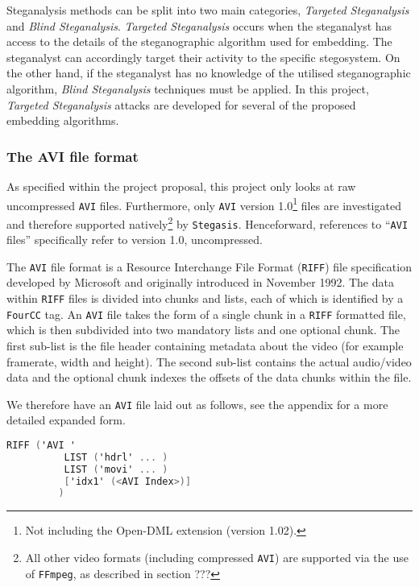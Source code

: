 \documentclass[paper=a4, fontsize=11pt,twoside]{scrartcl}    %
\begin{document}
Steganalysis methods can be split into two main categories, \textit{Targeted Steganalysis} and \textit{Blind Steganalysis}. \textit{Targeted Steganalysis} occurs when the steganalyst has access to the details of the steganographic algorithm used for embedding. The steganalyst can accordingly target their activity to the specific stegosystem. On the other hand, if the steganalyst has no knowledge of the utilised steganographic algorithm, \textit{Blind Steganalysis} techniques must be applied. In this project, \textit{Targeted Steganalysis} attacks are developed for several of the proposed embedding algorithms.

\subsubsection{The AVI file format}
As specified within the project proposal, this project only looks at raw uncompressed \texttt{AVI} files. Furthermore, only \texttt{AVI} version 1.0\footnote{Not including the Open-DML extension (version 1.02).} files are investigated and therefore supported natively\footnote{All other video formats (including compressed \texttt{AVI}) are supported via the use of \texttt{FFmpeg}, as described in section ???} by \texttt{Stegasis}. Henceforward, references to ``\texttt{AVI} files'' specifically refer to version 1.0, uncompressed.

The \texttt{AVI} file format is a Resource Interchange File Format (\texttt{RIFF}) file specification developed by Microsoft and originally introduced in November 1992. The data within \texttt{RIFF} files is divided into chunks and lists, each of which is identified by a \texttt{FourCC} tag. An \texttt{AVI} file takes the form of a single chunk in a \texttt{RIFF} formatted file, which is then subdivided into two mandatory lists and one optional chunk. The first sub-list is the file header containing metadata about the video (for example framerate, width and height). The second sub-list contains the actual audio/video data and the optional chunk indexes the offsets of the data chunks within the file.

We therefore have an \texttt{AVI} file laid out as follows, see the appendix for a more detailed expanded form.
\begin{lstlisting}[language=C, caption={\texttt{AVI RIFF} form}, frame=single, upquote=true]
	RIFF ('AVI '
	      LIST ('hdrl' ... )
	      LIST ('movi' ... )
 	      ['idx1' (<AVI Index>)]
	     )
\end{lstlisting}
\end{document}
